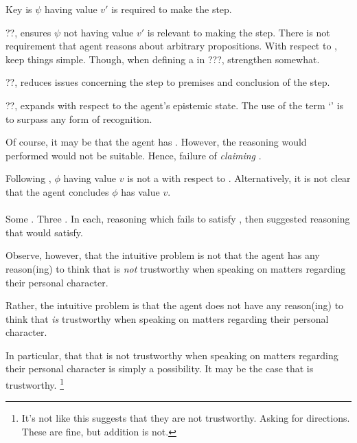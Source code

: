 \begin{note}
  Key is \(\psi\) having value \(v'\) is required to make the step.

  ??, ensures \(\psi\) not having value \(v'\) is relevant to making the step.
  There is not requirement that agent reasons about arbitrary \epVAd{} propositions.
  With respect to \ideaCS{}, keep things simple.
  Though, when defining a \requ{} in ???, strengthen somewhat.

  ??, reduces issues concerning the step to premises and conclusion of the step.

  ??, expands with respect to the agent's epistemic state.
  The use of the term `\committed{}' is to surpass any form of recognition.
\end{note}

\begin{note}
  Of course, it may be that the agent has \support{}.
  However, the reasoning would performed would not be suitable.
  Hence, failure of \emph{claiming} \support{}.

  Following \ideaS{}, \(\phi\) having value \(v\) is not a \sink{} with respect to .
  Alternatively, it is not clear that the agent concludes \(\phi\) has value \(v\).
\end{note}

\paragraph{}

\begin{note}
  Some .
  Three .
  In each, reasoning which fails to satisfy \ideaCS{}, then suggested reasoning that would satisfy.
\end{note}

\begin{note}
  Observe, however, that the intuitive problem is not that the agent has any reason(ing) to think that  is \emph{not} trustworthy when speaking on matters regarding their personal character.

  Rather, the intuitive problem is that the agent does not have any reason(ing) to think that  \emph{is} trustworthy when speaking on matters regarding their personal character.

  In particular, that that  is not trustworthy when speaking on matters regarding their personal character is simply a possibility.
  It may be the case that  is trustworthy.\nolinebreak
  \footnote{
    \color{red}
    It's not like this suggests that they are not trustworthy.
    Asking for directions.
    These are fine, but addition is not.
  }
\end{note}

